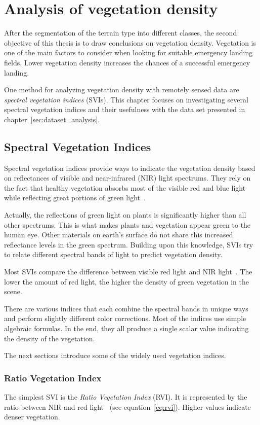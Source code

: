 \section{Analysis of vegetation density}
\label{sec:vegetation_analysis}
After the segmentation of the terrain type into different classes, the second objective of this thesis is to draw conclusions on vegetation density. Vegetation is one of the main factors to consider when looking for suitable emergency landing fields. Lower vegetation density increases the chances of a successful emergency landing.

One method for analyzing vegetation density with remotely sensed data are \emph{spectral vegetation indices} (SVIs). This chapter focuses on investigating several spectral vegetation indices and their usefulness with the data set presented in chapter~\ref{sec:dataset_analysis}.

\subsection{Spectral Vegetation Indices}
Spectral vegetation indices provide ways to indicate the vegetation density based on reflectances of visible and near-infrared (NIR) light spectrums. They rely on the fact that healthy vegetation absorbs most of the visible red and blue light while reflecting great portions of green light~\cite{glv03}.

Actually, the reflections of green light on plants is significantly higher than all other spectrums. This is what makes plants and vegetation appear green to the human eye. Other materials on earth's surface do not share this increased reflectance levels in the green spectrum. Building upon this knowledge, SVIs try to relate different spectral bands of light to predict vegetation density.

Most SVIs compare the difference between visible red light and NIR light~\cite{glv03}. The lower the amount of red light, the higher the density of green vegetation in the scene.

There are various indices that each combine the spectral bands in unique ways and perform slightly different color corrections. Most of the indices use simple algebraic formulas. In the end, they all produce a single scalar value indicating the density of the vegetation.

The next sections introduce some of the widely used vegetation indices.

\subsubsection{Ratio Vegetation Index}
The simplest SVI is the \emph{Ratio Vegetation Index} (RVI). It is represented by the ratio between NIR and red light~\cite{glv03} (see equation~\ref{eq:rvi}). Higher values indicate denser vegetation.

